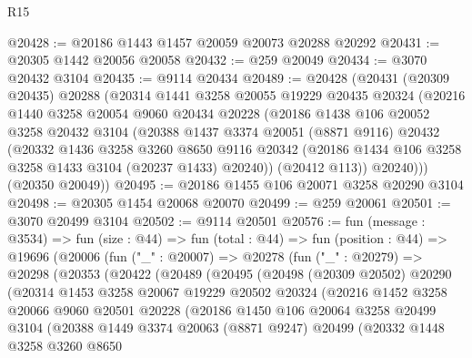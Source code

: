 \begin{lexlean}{R15}
\begin{coremodule}
@20428 := @20186 @1443 @1457 @20059 @20073 @20288 @20292
@20431 := @20305 @1442 @20056 @20058
@20432 := @259 @20049
@20434 := @3070 @20432 @3104
@20435 := @9114 @20434
@20489 := @20428
    (@20431
      (@20309 @20435)
      @20288
      (@20314
        @1441
        @3258
        @20055
        @19229
        @20435
        @20324
        (@20216
          @1440
          @3258
          @20054
          @9060
          @20434
          @20228
          (@20186
            @1438
            @106
            @20052
            @3258
            @20432
            @3104
            (@20388
              @1437
              @3374
              @20051
              (@8871 @9116)
              @20432
              (@20332
                @1436
                @3258
                @3260
                @8650
                @9116
                @20342
                (@20186 @1434 @106 @3258 @3258 @1433 @3104 (@20237 @1433) @20240))
              (@20412 @113))
            @20240)))
      (@20350 @20049))
@20495 := @20186 @1455 @106 @20071 @3258 @20290 @3104
@20498 := @20305 @1454 @20068 @20070
@20499 := @259 @20061
@20501 := @3070 @20499 @3104
@20502 := @9114 @20501
@20576 := fun (message : @3534) =>
  fun (size : @44) =>
  fun (total : @44) =>
  fun (position : @44) =>
  @19696
    (@20006
      (fun ("_" : @20007) =>
      @20278
        (fun ("_" : @20279) =>
        @20298
          (@20353
            (@20422
              (@20489
                (@20495
                  (@20498
                    (@20309 @20502)
                    @20290
                    (@20314
                      @1453
                      @3258
                      @20067
                      @19229
                      @20502
                      @20324
                      (@20216
                        @1452
                        @3258
                        @20066
                        @9060
                        @20501
                        @20228
                        (@20186
                          @1450
                          @106
                          @20064
                          @3258
                          @20499
                          @3104
                          (@20388
                            @1449
                            @3374
                            @20063
                            (@8871 @9247)
                            @20499
                            (@20332
                              @1448
                              @3258
                              @3260
                              @8650

\end{coremodule}
\end{lexlean}
